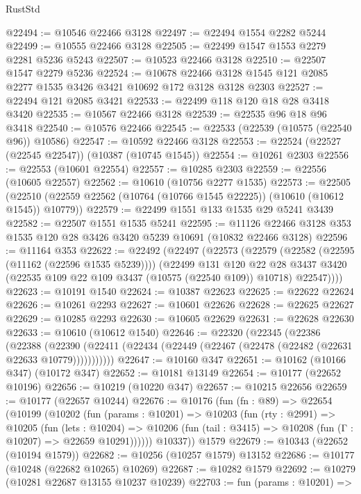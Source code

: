 \begin{lexlean}{RustStd}
\begin{coremodule}
@22494 := @10546 @22466 @3128
@22497 := @22494 @1554 @2282 @5244
@22499 := @10555 @22466 @3128
@22505 := @22499 @1547 @1553 @2279 @2281 @5236 @5243
@22507 := @10523 @22466 @3128
@22510 := @22507 @1547 @2279 @5236
@22524 := @10678 @22466 @3128 @1545 @121 @2085 @2277 @1535 @3426 @3421 @10692 @172 @3128 @3128 @2303
@22527 := @22494 @121 @2085 @3421
@22533 := @22499 @118 @120 @18 @28 @3418 @3420
@22535 := @10567 @22466 @3128
@22539 := @22535 @96 @18 @96 @3418
@22540 := @10576 @22466
@22545 := @22533 (@22539 (@10575 (@22540 @96)) @10586)
@22547 := @10592 @22466 @3128
@22553 := @22524 (@22527 (@22545 @22547)) (@10387 (@10745 @1545))
@22554 := @10261 @2303
@22556 := @22553 (@10601 @22554)
@22557 := @10285 @2303
@22559 := @22556 (@10605 @22557)
@22562 := @10610 (@10756 @2277 @1535)
@22573 := @22505
    (@22510 (@22559 @22562 (@10764 (@10766 @1545 @22225)) (@10610 (@10612 @1545)) @10779))
@22579 := @22499 @1551 @133 @1535 @29 @5241 @3439
@22582 := @22507 @1551 @1535 @5241
@22595 := @11126 @22466 @3128 @353 @1535 @120 @28 @3426 @3420 @5239 @10691 (@10832 @22466 @3128)
@22596 := @11164 @353
@22622 := @22492
    (@22497
      (@22573
        (@22579
          (@22582 (@22595 (@11162 (@22596 @1535 @5239))))
          (@22499
            @131
            @120
            @22
            @28
            @3437
            @3420
            (@22535 @109 @22 @109 @3437 (@10575 (@22540 @109)) @10718)
            @22547))))
@22623 := @10191 @1540
@22624 := @10387 @22623
@22625 := @22622 @22624
@22626 := @10261 @2293
@22627 := @10601 @22626
@22628 := @22625 @22627
@22629 := @10285 @2293
@22630 := @10605 @22629
@22631 := @22628 @22630
@22633 := @10610 (@10612 @1540)
@22646 := @22320
    (@22345
      (@22386
        (@22388
          (@22390 (@22411 (@22434 (@22449 (@22467 (@22478 (@22482 (@22631 @22633 @10779)))))))))))
@22647 := @10160 @347
@22651 := @10162 (@10166 @347) (@10172 @347)
@22652 := @10181 @13149
@22654 := @10177 (@22652 @10196)
@22656 := @10219 (@10220 @347)
@22657 := @10215 @22656
@22659 := @10177 (@22657 @10244)
@22676 := @10176
    (fun (fn : @89) =>
    @22654
      (@10199
        (@10202
          (fun (params : @10201) =>
          @10203
            (fun (rty : @2991) =>
            @10205
              (fun (lets : @10204) =>
              @10206 (fun (tail : @3415) => @10208 (fun (Γ : @10207) => @22659 @10291))))))
        @10337))
    @1579
@22679 := @10343 (@22652 (@10194 @1579))
@22682 := @10256 (@10257 @1579) @13152
@22686 := @10177 (@10248 (@22682 @10265) @10269)
@22687 := @10282 @1579
@22692 := @10279 (@10281 @22687 @13155 @10237 @10239)
@22703 := fun (params : @10201) =>

\end{coremodule}
\end{lexlean}
